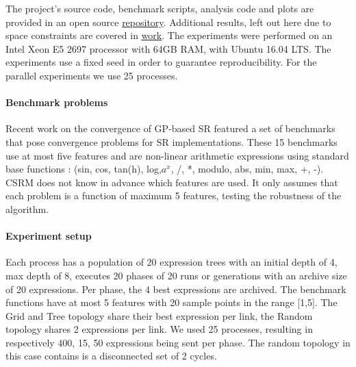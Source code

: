 
The project's source code, benchmark scripts, analysis code and plots are provided in an open source  \href{https://bitbucket.org/bcardoen/csrm}{repository}. Additional results, left out here due to space constraints are covered in \href{https://bitbucket.org/bcardoen/csrm/src/9de4b990ce27bbaeb885203f82a76635d8d92473/thesis/thesis/MsCThesisBenCardoen.pdf?at=master&fileviewer=file-view-default}{work}.
The experiments were performed on an Intel Xeon E5 2697 processor with 64GB RAM, with Ubuntu 16.04 LTS.  The experiments use a fixed seed in order to guarantee reproducibility. For the parallel experiments we use 25 processes.
 
\paragraph{Benchmark problems}
Recent work on the convergence of GP-based SR \cite{SRAccur, SRBaseline} featured a set of benchmarks that pose convergence problems for SR implementations. 
These 15 benchmarks use at most five features and are non-linear arithmetic expressions using standard base functions : (sin, cos, tan(h), log,$a^x$, /, *, modulo, abs, min, max, +, -). CSRM does not know in advance which features are used. It only assumes that each problem is a function of maximum 5 features, testing the robustness of the algorithm.

\paragraph{Experiment setup}
Each process has a population of 20 expression trees with an initial depth of 4, max depth of 8, executes 20 phases of 20 runs or generations with an archive size of 20 expressions. Per phase, the 4 best expressions are archived. The benchmark functions have at most 5 features with 20 sample points in the range [1,5]. The Grid and Tree topology share their best expression per link, the Random topology shares 2 expressions per link. We used 25 processes, resulting in respectively 400, 15, 50 expressions being sent per phase. The random topology in this case contains is a disconnected set of 2 cycles.

